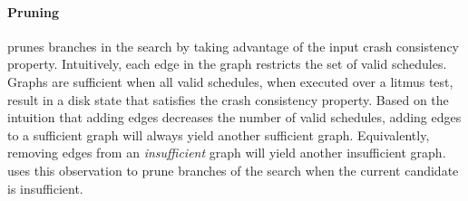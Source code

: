 
%
%
%

\paragraph{Pruning}
\sccsearch prunes branches in the search by taking advantage of the input crash consistency property.
Intuitively, each edge in the graph restricts the set of valid schedules.
Graphs are sufficient when all valid schedules, when executed over a litmus test, 
result in a disk state that satisfies the crash consistency property.
Based on the intuition that adding edges decreases the number of valid schedules,
adding edges to a sufficient graph will always yield another sufficient graph.
Equivalently, removing edges from an \textit{insufficient} graph will 
yield another insufficient graph.
\sccsearch uses this observation to prune branches of the search when the current candidate is insufficient.

